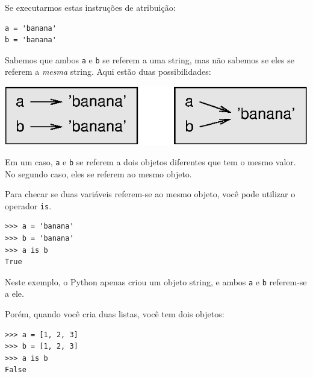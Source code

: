 
Se executarmos estas instruções de atribuição:

\beforeverb
\begin{verbatim}
a = 'banana'
b = 'banana'
\end{verbatim}
\afterverb
%

Sabemos que ambos {\tt a} e {\tt b} se referem a 
uma string, mas não sabemos se eles se referem a \emph{mesma} string.
Aqui estão duas possibilidades:


\beforefig
\centerline{\includegraphics{figs2/list1.eps}}
\afterfig

Em um caso, {\tt a} e {\tt b} se referem a dois objetos diferentes
que tem o mesmo valor. No segundo caso, eles se referem ao mesmo objeto.


Para checar se duas variáveis referem-se ao mesmo objeto, você pode
utilizar o operador {\tt is}.

\beforeverb
\begin{verbatim}
>>> a = 'banana'
>>> b = 'banana'
>>> a is b
True
\end{verbatim}
\afterverb
%

Neste exemplo, o Python apenas criou um objeto string,
e ambos {\tt a} e {\tt b} referem-se a ele.

Porém, quando você cria duas listas, você tem dois objetos:

\beforeverb
\begin{verbatim}
>>> a = [1, 2, 3]
>>> b = [1, 2, 3]
>>> a is b
False
\end{verbatim}
\afterverb
%

